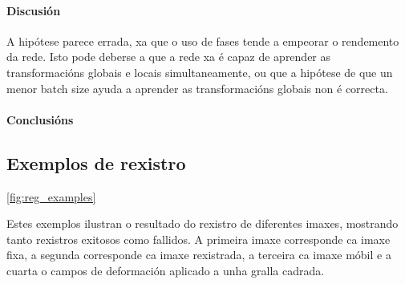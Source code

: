 \paragraph{Discusión}
\label{par:Discusion-phases}

A hipótese parece errada, xa que o uso de fases tende a empeorar o rendemento da rede.
Isto pode deberse a que a rede xa é capaz de aprender as transformacións globais e locais simultaneamente, ou que a hipótese de que un menor batch size ayuda a aprender as transformacións globais non é correcta.

\paragraph{Conclusións}
\label{par:Conclusions-phases}


\subsection{Exemplos de rexistro}
\label{subsec:Exemplos de rexistro}

\ref{fig:reg_examples}

Estes exemplos ilustran o resultado do rexistro de diferentes imaxes, mostrando tanto rexistros exitosos como fallidos.
A primeira imaxe corresponde ca imaxe fixa, a segunda corresponde ca imaxe rexistrada, a terceira ca imaxe móbil e a cuarta o campos de deformación aplicado a unha gralla cadrada.

